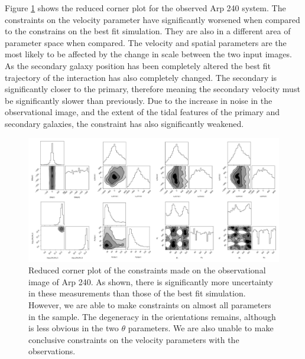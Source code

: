 Figure \ref{fig:obs_corner_plot} shows the reduced corner plot for the observed Arp 240 system. The constraints on the velocity parameter have significantly worsened when compared to the constrains on the best fit simulation. They are also in a different area of parameter space when compared. The velocity and spatial parameters are the most likely to be affected by the change in scale between the two input images. As the secondary galaxy position has been completely altered the best fit trajectory of the interaction has also completely changed. The secondary is significantly closer to the primary, therefore meaning the secondary velocity must be significantly slower than previously. Due to the increase in noise in the observational image, and the extent of the tidal features of the primary and secondary galaxies, the constraint has also significantly weakened.

\begin{figure}
    \centering
    \includegraphics[width=\textwidth]{Chapter1/figures/Arp240-red-corner-obs.pdf}
    \caption{Reduced corner plot of the constraints made on the observational image of Arp 240. As shown, there is significantly more uncertainty in these measurements than those of the best fit simulation. However, we are able to make constraints on almost all parameters in the sample. The degeneracy in the orientations remains, although is less obvious in the two $\theta$ parameters. We are also unable to make conclusive constraints on the velocity parameters with the observations.}
    \label{fig:obs_corner_plot}
\end{figure}

